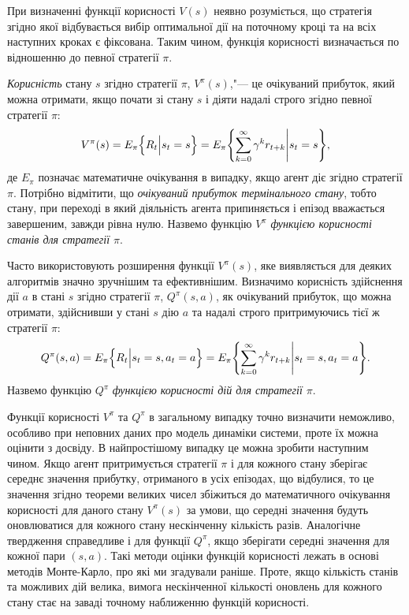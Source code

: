 \documentclass[a4paper,10pt,fleqn]{article}
\begin{document}
При визначенні функції корисності $V(s)$ неявно розуміється, що стратегія згідно якої відбувається вибір оптимальної дії на поточному кроці та на всіх наступних кроках є фіксована. Таким чином, функція корисності визначається по відношенню до певної стратегії $\pi$.

\emph{Корисність} стану $s$ згідно стратегії $\pi$, $V^\pi(s)$,"--- це очікуваний прибуток, який можна отримати, якщо почати зі стану $s$ і діяти надалі строго згідно певної стратегії $\pi$:
\begin{equation}
V^\pi(s) = E_\pi \Bigl\{ R_t \Big| s_t = s \Bigr \} = E_\pi \Biggl\{\sum_{k=0}^{\infty}\gamma^k r_{t+k} \Bigg| s_t=s \Biggr\},
\end{equation}
де $E_\pi{}$ позначає математичне очікування в випадку, якщо агент діє згідно стратегії $\pi$. Потрібно відмітити, що \emph{очікуваний прибуток термінального стану}, тобто стану, при переході в який діяльність агента припиняється і епізод вважається завершеним, завжди рівна нулю. Назвемо функцію $V^\pi$ \emph{функцією корисності станів для стратегії $\pi$}.

Часто використовують розширення функції $V^\pi(s)$, яке виявляється для деяких алгоритмів значно зручнішим та ефективнішим. Визначимо корисність здійснення дії $a$ в стані $s$ згідно стратегії $\pi$, $Q^\pi(s,a)$, як очікуваний прибуток, що можна отримати, здійснивши у стані $s$ дію $a$ та надалі строго притримуючись тієї ж стратегії $\pi$:
\begin{equation}
Q^\pi(s,a)=E_\pi \Bigl\{ R_t \Big| s_t=s, a_t=a \Bigr\} = E_\pi \Biggl\{\sum_{k=0}^{\infty}\gamma^k r_{t+k} \Bigg| s_t=s,a_t=a \Biggr\}.
\end{equation}
Назвемо функцію $Q^\pi$ \emph{функцією корисності дій для стратегії $\pi$}.

Функції корисності $V^\pi$ та $Q^\pi$ в загальному випадку точно визначити неможливо, особливо при неповних даних про модель динаміки системи, проте їх можна оцінити з досвіду. В найпростішому випадку це можна зробити наступним чином. Якщо агент притримується стратегії $\pi$ і для кожного стану зберігає середнє значення прибутку, отриманого в усіх епізодах, що відбулися, то це значення згідно теореми великих чисел збіжиться до математичного очікування корисності для даного стану $V^\pi(s)$ за умови, що середні значення будуть оновлюватися для кожного стану нескінченну кількість разів. Аналогічне твердження справедливе і для функції $Q^\pi$, якщо зберігати середні значення для кожної пари $(s,a)$. Такі методи оцінки функцій корисності лежать в основі методів Монте-Карло, про які ми згадували раніше. Проте, якщо кількість станів та можливих дій велика, вимога нескінченної кількості оновлень для кожного стану стає на заваді точному наближенню функцій корисності.
\end{document}
